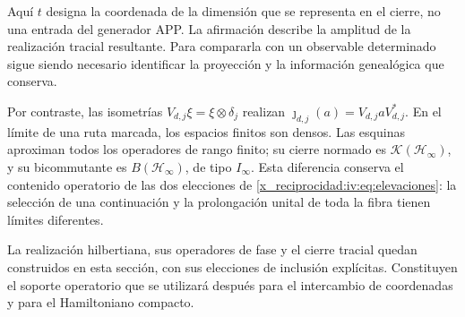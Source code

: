 Aquí \(t\) designa la coordenada de la dimensión que se representa
en el cierre, no una entrada del generador APP. La afirmación
describe la amplitud de la realización tracial resultante. Para
compararla con un observable determinado sigue siendo necesario
identificar la proyección y la información genealógica que conserva.

Por contraste, las isometrías
\(V_{d,j}\xi=\xi\otimes\delta_j\) realizan
\(\jmath_{d,j}(a)=V_{d,j}aV_{d,j}^*\). En el límite de una
ruta marcada, los espacios finitos son densos. Las esquinas
aproximan todos los operadores de rango finito; su cierre normado
es \(\mathcal K(\mathcal H_\infty)\), y su bicommutante es
\(B(\mathcal H_\infty)\), de tipo \(I_\infty\). Esta
diferencia conserva el contenido operatorio de las dos elecciones
de \eqref{x_reciprocidad:iv:eq:elevaciones}: la selección de una continuación y
la prolongación unital de toda la fibra tienen límites diferentes.

La realización hilbertiana, sus operadores de fase y el cierre
tracial quedan construidos en esta sección, con sus elecciones de
inclusión explícitas. Constituyen el
soporte operatorio que se utilizará después para el intercambio de
coordenadas y para el Hamiltoniano compacto.
